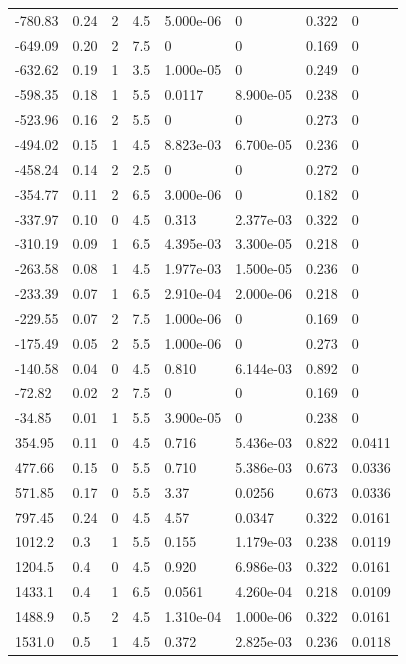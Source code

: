 \documentclass[preview]{standalone}
\begin{document}
{{\begin{tabular}{L{1.2cm}C{1.2cm} C{0.3cm}C{0.5cm} C{1.4cm}C{1.4cm} C{1.4cm}C{1.4cm}}
  -780.83  &  0.24  & 2     & 4.5 &  5.000e-06  & 0  & 0.322 &  0   \\ 
  -649.09  &  0.20  & 2     & 7.5 &  0  & 0  & 0.169 &  0   \\ 
  -632.62  &  0.19  & 1     & 3.5 &  1.000e-05  & 0  & 0.249 &  0   \\ 
  -598.35  &  0.18  & 1     & 5.5 &  0.0117  & 8.900e-05  & 0.238 &  0   \\ 
  -523.96  &  0.16  & 2     & 5.5 &  0  & 0  & 0.273 &  0   \\ 
  -494.02  &  0.15  & 1     & 4.5 &  8.823e-03  & 6.700e-05  & 0.236 &  0   \\ 
  -458.24  &  0.14  & 2     & 2.5 &  0  & 0  & 0.272 &  0   \\ 
  -354.77  &  0.11  & 2     & 6.5 &  3.000e-06  & 0  & 0.182 &  0   \\ 
  -337.97  &  0.10  & 0     & 4.5 &  0.313  & 2.377e-03  & 0.322 &  0   \\ 
  -310.19  &  0.09  & 1     & 6.5 &  4.395e-03  & 3.300e-05  & 0.218 &  0   \\ 
  -263.58  &  0.08  & 1     & 4.5 &  1.977e-03  & 1.500e-05  & 0.236 &  0   \\ 
  -233.39  &  0.07  & 1     & 6.5 &  2.910e-04  & 2.000e-06  & 0.218 &  0   \\ 
  -229.55  &  0.07  & 2     & 7.5 &  1.000e-06  & 0  & 0.169 &  0   \\ 
  -175.49  &  0.05  & 2     & 5.5 &  1.000e-06  & 0  & 0.273 &  0   \\ 
  -140.58  &  0.04  & 0     & 4.5 &  0.810  & 6.144e-03  & 0.892 &  0   \\ 
  -72.82  &  0.02  & 2     & 7.5 &  0  & 0  & 0.169 &  0   \\ 
  -34.85  &  0.01  & 1     & 5.5 &  3.900e-05  & 0  & 0.238 &  0   \\ 
  354.95  &  0.11  & 0     & 4.5 &  0.716  & 5.436e-03  & 0.822 &  0.0411   \\ 
  477.66  &  0.15  & 0     & 5.5 &  0.710  & 5.386e-03  & 0.673 &  0.0336   \\ 
  571.85  &  0.17  & 0     & 5.5 &  3.37  & 0.0256  & 0.673 &  0.0336   \\ 
  797.45  &  0.24  & 0     & 4.5 &  4.57  & 0.0347  & 0.322 &  0.0161   \\ 
  1012.2  &   0.3  & 1     & 5.5 &  0.155  & 1.179e-03  & 0.238 &  0.0119   \\ 
  1204.5  &   0.4  & 0     & 4.5 &  0.920  & 6.986e-03  & 0.322 &  0.0161   \\ 
  1433.1  &   0.4  & 1     & 6.5 &  0.0561  & 4.260e-04  & 0.218 &  0.0109   \\ 
  1488.9  &   0.5  & 2     & 4.5 &  1.310e-04  & 1.000e-06  & 0.322 &  0.0161   \\ 
  1531.0  &   0.5  & 1     & 4.5 &  0.372  & 2.825e-03  & 0.236 &  0.0118   \\ 
\hline 
\end{tabular} 

}}
\end{document}
